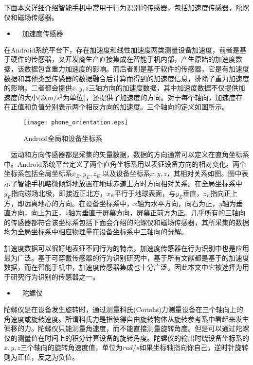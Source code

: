 \par 下面本文详细介绍智能手机中常用于行为识别的传感器，包括加速度传感器，陀螺仪和磁场传感器。
\begin{itemize}
	\item　加速度传感器
\end{itemize}
\par 在Android系统平台下，存在加速度和线性加速度两类测量设备加速度，前者是基于硬件的传感器，又开发商生产直接集成在智能手机内部，产生原始的加速度数据，该数据包含重力加速度的影响。而后者则是基于软件的传感器，它是有加速度数据和其他类型传感器的数据融合后计算而得到的加速度信息，排除了重力加速度的影响。二者都会提供$x,  y,  z$三轴方向的加速度数据，其中加速度数据不仅提供加速度的大小(以$m/s^2$为单位)，还提供了加速度的方向。对于每个轴向，加速度存在正值和负值分别表示两个相反方向的加速度。三个轴向的定义如图所示。

\begin{figure}[ht]
\centering
\texttt{[image: phone\_orientation.eps]}
\caption{Android全局和设备坐标系}
\end{figure}

\par　运动和方向传感器都是采集的矢量数据，数据的方向通常可以定义在直角坐标系中。Android系统平台定义了两个直角坐标系用以表征设备方向的相对变化。两个坐标系包括全局坐标系$x_E,  y_E,  z_E$ 以及设备坐标系$x,  y,  z$，其相对关系如图。图中表示了智能手机略微倾斜地放置在地球赤道上方时方向相对关系。在全局坐标系中$y_E$指向磁场北极，即接近正北方，$x_E$平行于地球表面，与$y_E$垂直，$z_E$指向正上方，即远离地心的方向。在设备坐标系中，$x$轴为水平方向，向右为正，$y$轴为垂直方向，向上为正，$z$轴为垂直于屏幕方向，屏幕正前方为正。几乎所有的三轴向的传感器都符合该坐标系包括下面会介绍的陀螺仪和磁场传感器，其所采集的数据均为全局坐标系中相应物理量在设备坐标系中三轴向的分解。
\par 加速度数据可以很好地表征不同行为的特点，加速度传感器在行为识别中也是应用最为广泛。基于可穿戴传感器的行为识别研究中，基于所有文献都是基于的加速度数据，而在智能手机中，加速度传感器集成也十分广泛，因此本文中它被选择为用于研究行为识别的传感器之一。

\begin{itemize}
	\item　陀螺仪
\end{itemize}
\par 陀螺仪是在设备发生旋转时，通过测量科氏(Coriolis)力测量设备在三个轴向上的角速度或旋转速度。所谓科氏力是指使得自由旋转物体从旋转参考系中看起来发生偏移的力。陀螺仪只能测量角速度，而不能直接测量旋转角度。但是可以通过陀螺仪的测量值在时间上的积分计算设备的旋转角度。陀螺仪的输出时绕设备坐标系的$x,  y,  z$三个轴向的旋转角速度值，单位为$rad/s$如果坐标轴指向你自己，逆时针旋转则为正值，反之为负值。

